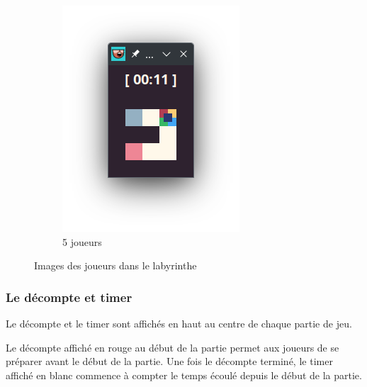 \begin{figure}[!htb]
\begin{subfigure}[b]{0.2\textwidth}
        \includegraphics[width=\textwidth]{ressources/Implementation/Labyrinthe/Vue/Players/5Players.png}
        \caption{5 joueurs}
    \end{subfigure}

    \caption{Images des joueurs dans le labyrinthe}
\end{figure}

\subsubsection*{Le décompte et timer}

Le décompte et le timer sont affichés en haut au centre de chaque partie de jeu.

Le décompte affiché en rouge au début de la partie permet aux joueurs de se préparer avant le début de la partie. Une fois le décompte terminé, le timer affiché en blanc commence à compter le temps écoulé depuis le début de la partie.

